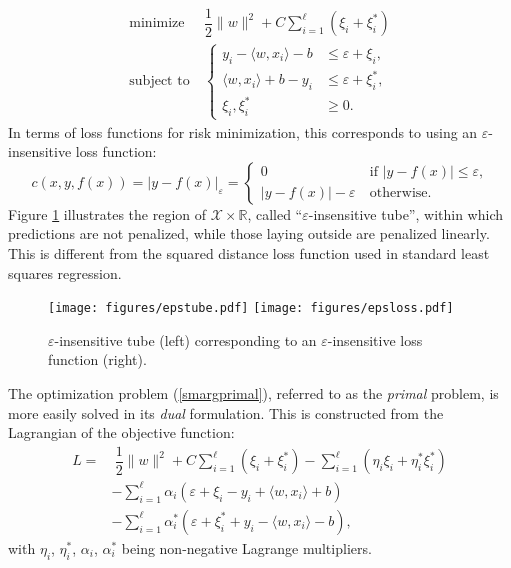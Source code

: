 \documentclass[12pt]{report}
\begin{document}
\begin{equation} \label{smargprimal}
\begin{split}
\text{minimize} &\ \dfrac{1}{2}\| w \|^2 + C\sum_{i=1}^{\ell}(\xi_{i} + \xi_{i}^{*}) \\
\text{subject to} &\ \begin{cases}
y_{i} - \langle w,x_{i} \rangle - b &\leq \varepsilon + \xi_{i} \text{,}\\
\langle w,x_{i} \rangle + b - y_{i} &\leq \varepsilon + \xi_{i}^{*} \text{,}\\
\xi_{i}, \xi_{i}^{*} &\geq 0 \text{.}
\end{cases}
\end{split}
\end{equation}
In terms of loss functions for risk minimization, this corresponds to using an $ \varepsilon $-insensitive loss function:
\begin{equation} \label{epsloss}
c(x,y,f(x)) = \vert y - f(x) \vert_{\varepsilon} = \begin{cases}
0 &\ \text{if } \vert y - f(x) \vert \leq \varepsilon \text{,}\\
\vert y - f(x) \vert - \varepsilon &\ \text{otherwise} \text{.}
\end{cases}
\end{equation}
Figure \ref{epstubefig} illustrates the region of $ \mathcal{X} \times \mathbb{R} $, called ``$ \varepsilon $-insensitive tube'', within which predictions are not penalized, while those laying outside are penalized linearly. This is different from the squared distance loss function used in standard least squares regression.

\begin{figure}[h]
  	\begin{adjustwidth}{-1in}{-1in}
  	\centering
  	\texttt{[image: figures/epstube.pdf]}
  	\qquad
  	\texttt{[image: figures/epsloss.pdf]}
  	\end{adjustwidth}
  \caption{$\varepsilon$-insensitive tube (left) corresponding to an $\varepsilon$-insensitive loss function (right).}
  \label{epstubefig}
\end{figure}

The optimization problem (\ref{smargprimal}), referred to as the \textit{primal} problem, is more easily solved in its \textit{dual} formulation. This is constructed from the Lagrangian of the objective function:
\begin{equation} \label{lagrangian}
\begin{split}
L =& \ \dfrac{1}{2}\| w \|^2 + C\sum_{i=1}^{\ell}(\xi_{i} + \xi_{i}^{*}) - \sum_{i=1}^{\ell}(\eta_{i}\xi_{i} + \eta_{i}^{*}\xi_{i}^{*}) \\
&- \sum_{i=1}^{\ell}\alpha_{i}(\varepsilon + \xi_{i} - y_{i} + \langle w,x_{i} \rangle + b) \\
&- \sum_{i=1}^{\ell}\alpha_{i}^{*}(\varepsilon + \xi_{i}^{*} + y_{i} - \langle w,x_{i} \rangle - b) \text{,}
\end{split}
\end{equation}
with $ \eta_{i} $, $ \eta_{i}^{*} $, $ \alpha_{i} $, $ \alpha_{i}^{*} $ being non-negative Lagrange multipliers.
\end{document}
